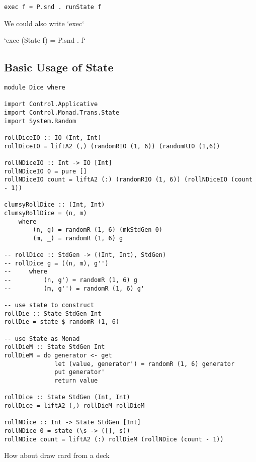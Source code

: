 
\begin{verbatim}
exec f = P.snd . runState f
\end{verbatim}

We could also write `exec`

`exec (State f) = P.snd . f`


\subsection{Basic Usage of State}

\begin{verbatim}
module Dice where

import Control.Applicative
import Control.Monad.Trans.State
import System.Random

rollDiceIO :: IO (Int, Int)
rollDiceIO = liftA2 (,) (randomRIO (1, 6)) (randomRIO (1,6))

rollNDiceIO :: Int -> IO [Int]
rollNDiceIO 0 = pure []
rollNDiceIO count = liftA2 (:) (randomRIO (1, 6)) (rollNDiceIO (count - 1))

clumsyRollDice :: (Int, Int)
clumsyRollDice = (n, m)
    where
        (n, g) = randomR (1, 6) (mkStdGen 0)
        (m, _) = randomR (1, 6) g

-- rollDice :: StdGen -> ((Int, Int), StdGen)
-- rollDice g = ((n, m), g'')
--     where
--         (n, g') = randomR (1, 6) g
--         (m, g'') = randomR (1, 6) g'

-- use state to construct
rollDie :: State StdGen Int
rollDie = state $ randomR (1, 6)

-- use State as Monad
rollDieM :: State StdGen Int
rollDieM = do generator <- get
              let (value, generator') = randomR (1, 6) generator
              put generator'
              return value

rollDice :: State StdGen (Int, Int)
rollDice = liftA2 (,) rollDieM rollDieM

rollNDice :: Int -> State StdGen [Int]
rollNDice 0 = state (\s -> ([], s))
rollNDice count = liftA2 (:) rollDieM (rollNDice (count - 1))
\end{verbatim}

How about draw card from a deck


